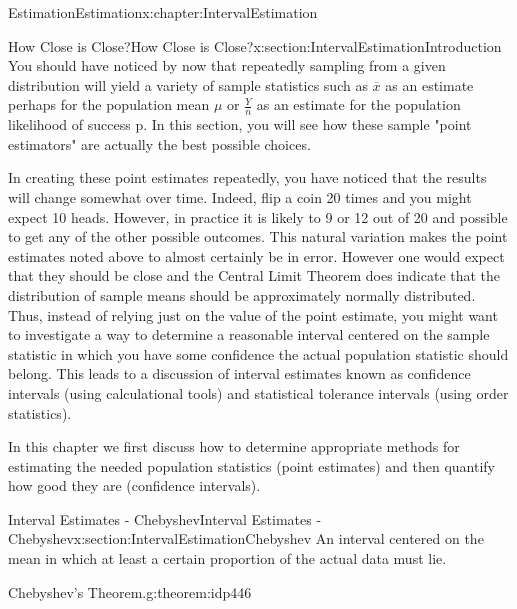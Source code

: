 \documentclass[oneside,10pt,]{book}
\numberwithin{equation}{section}
\begin{document}
\begin{chapterptx}{Estimation}{}{Estimation}{}{}{x:chapter:IntervalEstimation}
%
%
\typeout{************************************************}
\typeout{************************************************}
%
\begin{sectionptx}{How Close is Close?}{}{How Close is Close?}{}{}{x:section:IntervalEstimationIntroduction}
You should have noticed by now that repeatedly sampling from a given distribution will yield a variety of sample statistics such as \(\overline{x}\) as an estimate perhaps for the population mean \(\mu\) or \(\frac{Y}{n}\) as an estimate for the population likelihood of success p. In this section, you will see how these sample "point estimators" are actually the best possible choices.%
\par
In creating these point estimates repeatedly, you have noticed that the results will change somewhat over time. Indeed, flip a coin 20 times and you might expect 10 heads. However, in practice it is likely to 9 or 12 out of 20 and possible to get any of the other possible outcomes. This natural variation makes the point estimates noted above to almost certainly be in error. However one would expect that they should be close and the Central Limit Theorem does indicate that the distribution of sample means should be approximately normally distributed. Thus, instead of relying just on the value of the point estimate, you might want to investigate a way to determine a reasonable interval centered on the sample statistic in which you have some confidence the actual population statistic should belong. This leads to a discussion of interval estimates known as confidence intervals (using calculational tools) and statistical tolerance intervals (using order statistics).%
\par
In this chapter we first discuss how to determine appropriate methods for estimating the needed population statistics (point estimates) and then quantify how good they are (confidence intervals).%
\end{sectionptx}
%
%
\typeout{************************************************}
\typeout{************************************************}
%
\begin{sectionptx}{Interval Estimates - Chebyshev}{}{Interval Estimates - Chebyshev}{}{}{x:section:IntervalEstimationChebyshev}
An interval centered on the mean in which at least a certain proportion of the actual data must lie.%
\begin{theorem}{Chebyshev's Theorem.}{}{g:theorem:idp446}%

\end{theorem}
\end{sectionptx}
\end{chapterptx}
\end{document}
